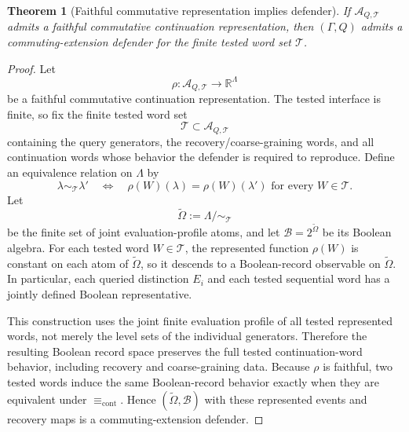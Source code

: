 \documentclass[11pt]{article}
\newtheorem{theorem}{Theorem}[section]
\newcommand{\R}{\mathbb R}
\newcommand{\AQtest}{\mathcal A_{Q,\mathcal T}}
\begin{document}
\begin{theorem}[Faithful commutative representation implies defender]\label{thm:commutative-to-defender}
If $\AQtest$ admits a faithful commutative continuation representation, then $(\Gamma,Q)$ admits a commuting-extension defender for the finite tested word set $\mathcal T$.
\end{theorem}
\begin{proof}
Let
\[
 \rho:\AQtest\to\R^\Lambda
\]
be a faithful commutative continuation representation.  The tested interface is finite, so fix the finite tested word set
\[
 \mathcal T\subset \AQtest
\]
containing the query generators, the recovery/coarse-graining words, and all continuation words whose behavior the defender is required to reproduce.  Define an equivalence relation on $\Lambda$ by
\[
 \lambda\sim_{\mathcal T}\lambda'
 \quad\Longleftrightarrow\quad
 \rho(W)(\lambda)=\rho(W)(\lambda')
 \text{ for every }W\in\mathcal T.
\]
Let
\[
 \widetilde\Omega:=\Lambda/{\sim_{\mathcal T}}
\]
be the finite set of joint evaluation-profile atoms, and let $\mathcal B=2^{\widetilde\Omega}$ be its Boolean algebra.  For each tested word $W\in\mathcal T$, the represented function $\rho(W)$ is constant on each atom of $\widetilde\Omega$, so it descends to a Boolean-record observable on $\widetilde\Omega$.  In particular, each queried distinction $E_i$ and each tested sequential word has a jointly defined Boolean representative.

This construction uses the joint finite evaluation profile of all tested represented words, not merely the level sets of the individual generators.  Therefore the resulting Boolean record space preserves the full tested continuation-word behavior, including recovery and coarse-graining data.  Because $\rho$ is faithful, two tested words induce the same Boolean-record behavior exactly when they are equivalent under $\equiv_{\mathrm{cont}}$.  Hence $(\widetilde\Omega,\mathcal B)$ with these represented events and recovery maps is a commuting-extension defender.
\end{proof}
\end{document}
